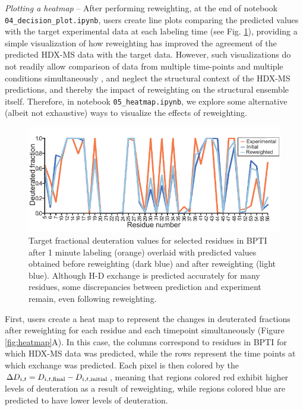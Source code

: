 \documentclass[9pt,tutorial]{livecoms}
\begin{document}
\noindent
\textit{Plotting a heatmap} -- After performing reweighting, at the end of notebook \texttt{04\_decision\_plot.ipynb}, users create line plots comparing the predicted values with the target experimental data at each labeling time (see Fig. \ref{fig:lineplot}), providing a simple visualization of how reweighting has improved the agreement of the predicted HDX-MS data with the target data.
However, such visualizations do not readily allow comparison of data from multiple time-points and multiple conditions simultaneously \cite{Masson2019}, and neglect the structural context of the HDX-MS predictions, and thereby the impact of reweighting on the structural ensemble itself.
Therefore, in notebook \texttt{05\_heatmap.ipynb}, we explore some alternative (albeit not exhaustive) ways to visualize the effects of reweighting.

\begin{figure}[ht]
    \centering
    \includegraphics[width=0.9\linewidth]{Fig5_BPTI_lineplot_1min_v3.pdf}
    \caption{Target fractional deuteration values for selected residues in BPTI after 1 minute labeling (orange) overlaid with predicted values obtained before reweighting (dark blue) and after reweighting (light blue). Although H-D exchange is predicted accurately for many residues, some discrepancies between prediction and experiment remain, even following reweighting.}
    \label{fig:lineplot}
\end{figure}

First, users create a heat map to represent the changes in deuterated fractions after reweighting for each residue and each timepoint simultaneously (Figure \ref{fig:heatmap}A).
In this case, the columns correspond to residues in BPTI for which HDX-MS data was predicted, while the rows represent the time points at which exchange was predicted.
Each pixel is then colored by the $\Delta{D_{i,t}} = D_{i,t,\textnormal{final}} - D_{i,t,\textnormal{initial}}$, meaning that regions colored red exhibit higher levels of deuteration as a result of reweighting, while regions colored blue are predicted to have lower levels of deuteration.
\end{document}
